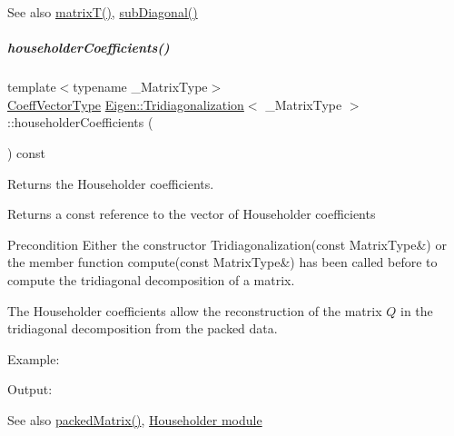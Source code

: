 \begin{DoxySeeAlso}{See also}
\hyperlink{group___eigenvalues___module_a6eb5ef94b8b9bb013c0e69b6df56d0df}{matrix\+T()}, \hyperlink{group___eigenvalues___module_ac423dbb91157c159bdcb4b5a8371232e}{sub\+Diagonal()} 
\end{DoxySeeAlso}
\mbox{\label{group___eigenvalues___module_ac95b4e43dcf6c3c5074b8bea4fc67887}} 
\subparagraph{\texorpdfstring{householder\+Coefficients()}{householderCoefficients()}\hspace{0.1cm}{\footnotesize\ttfamily [1/2]}}
{\footnotesize\ttfamily template$<$typename \+\_\+\+Matrix\+Type$>$ \\
\hyperlink{group___core___module}{Coeff\+Vector\+Type} \hyperlink{group___eigenvalues___module_class_eigen_1_1_tridiagonalization}{Eigen\+::\+Tridiagonalization}$<$ \+\_\+\+Matrix\+Type $>$\+::householder\+Coefficients (\begin{DoxyParamCaption}{ }\end{DoxyParamCaption}) const\hspace{0.3cm}{\ttfamily [inline]}}



Returns the Householder coefficients. 

\begin{DoxyReturn}{Returns}
a const reference to the vector of Householder coefficients
\end{DoxyReturn}
\begin{DoxyPrecond}{Precondition}
Either the constructor Tridiagonalization(const Matrix\+Type\&) or the member function compute(const Matrix\+Type\&) has been called before to compute the tridiagonal decomposition of a matrix.
\end{DoxyPrecond}
The Householder coefficients allow the reconstruction of the matrix $ Q $ in the tridiagonal decomposition from the packed data.

Example\+: 
\begin{DoxyCodeInclude}
\end{DoxyCodeInclude}
 Output\+: 
\begin{DoxyVerbInclude}
\end{DoxyVerbInclude}


\begin{DoxySeeAlso}{See also}
\hyperlink{group___eigenvalues___module_a47858b3895e64acafb1bb2e97f98a154}{packed\+Matrix()}, \hyperlink{group___householder___module}{Householder module} 
\end{DoxySeeAlso}


